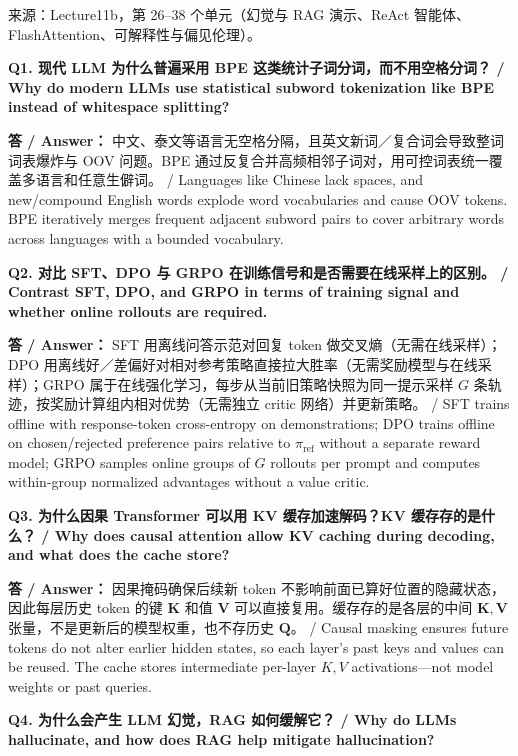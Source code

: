 来源：Lecture11b，第 26–38 个单元（幻觉与 RAG 演示、ReAct 智能体、FlashAttention、可解释性与偏见伦理）。



\textbf{Q1. 现代 LLM 为什么普遍采用 BPE 这类统计子词分词，而不用空格分词？ / Why do modern LLMs use statistical subword tokenization like BPE instead of whitespace splitting?}

\textbf{答 / Answer：} 中文、泰文等语言无空格分隔，且英文新词／复合词会导致整词词表爆炸与 OOV 问题。BPE 通过反复合并高频相邻子词对，用可控词表统一覆盖多语言和任意生僻词。 / Languages like Chinese lack spaces, and new/compound English words explode word vocabularies and cause OOV tokens. BPE iteratively merges frequent adjacent subword pairs to cover arbitrary words across languages with a bounded vocabulary.

\textbf{Q2. 对比 SFT、DPO 与 GRPO 在训练信号和是否需要在线采样上的区别。 / Contrast SFT, DPO, and GRPO in terms of training signal and whether online rollouts are required.}

\textbf{答 / Answer：} SFT 用离线问答示范对回复 token 做交叉熵（无需在线采样）；DPO 用离线好／差偏好对相对参考策略直接拉大胜率（无需奖励模型与在线采样）；GRPO 属于在线强化学习，每步从当前旧策略快照为同一提示采样 $G$ 条轨迹，按奖励计算组内相对优势（无需独立 critic 网络）并更新策略。 / SFT trains offline with response-token cross-entropy on demonstrations; DPO trains offline on chosen/rejected preference pairs relative to $\pi_{\text{ref}}$ without a separate reward model; GRPO samples online groups of $G$ rollouts per prompt and computes within-group normalized advantages without a value critic.

\textbf{Q3. 为什么因果 Transformer 可以用 KV 缓存加速解码？KV 缓存存的是什么？ / Why does causal attention allow KV caching during decoding, and what does the cache store?}

\textbf{答 / Answer：} 因果掩码确保后续新 token 不影响前面已算好位置的隐藏状态，因此每层历史 token 的键 $\mathbf{K}$ 和值 $\mathbf{V}$ 可以直接复用。缓存存的是各层的中间 $\mathbf{K},\mathbf{V}$ 张量，不是更新后的模型权重，也不存历史 $\mathbf{Q}$。 / Causal masking ensures future tokens do not alter earlier hidden states, so each layer's past keys and values can be reused. The cache stores intermediate per-layer $K,V$ activations—not model weights or past queries.

\textbf{Q4. 为什么会产生 LLM 幻觉，RAG 如何缓解它？ / Why do LLMs hallucinate, and how does RAG help mitigate hallucination?}

